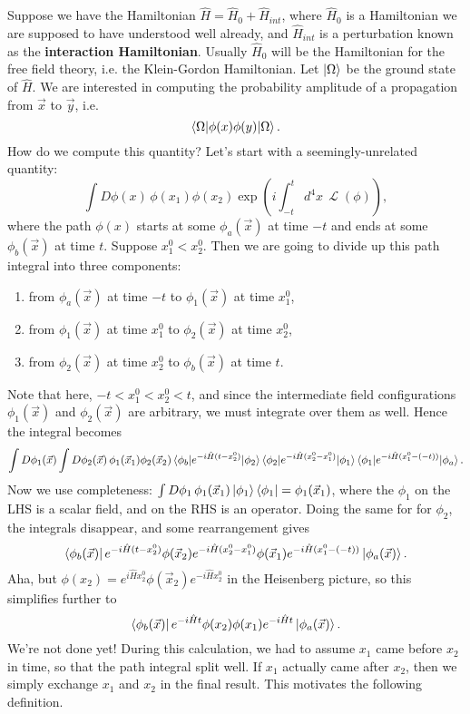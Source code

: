 \documentclass{report}
\theoremstyle{plain}
\theoremstyle{definition}
\theoremstyle{remark}
\DeclareMathOperator{\cL}{\mathcal{L}}
\begin{document}
Suppose we have the Hamiltonian $\hat{H} = \hat{H}_0 + \hat{H}_{int}$,
where $\hat{H}_0$ is a Hamiltonian we are supposed to have understood
well already, and $\hat{H}_{int}$ is a perturbation known as the {\bf
  interaction Hamiltonian}. Usually $\hat{H}_0$ will be the
Hamiltonian for the free field theory, i.e. the Klein-Gordon
Hamiltonian. Let $\ket{\Omega}$ be the ground state of $\hat{H}$. We
are interested in computing the probability amplitude of a propagation
from $\vec{x}$ to $\vec{y}$, i.e.
$$ \braket{\Omega| \phi(x) \phi(y) | \Omega}. $$
How do we compute this quantity? Let's start with a
seemingly-unrelated quantity:
$$ \int D\phi(x) \, \phi(x_1) \phi(x_2) \exp\left(i \int_{-t}^t d^4x \, \cL(\phi)\right), $$
where the path $\phi(x)$ starts at some $\phi_a(\vec{x})$ at time $-t$
and ends at some $\phi_b(\vec{x})$ at time $t$. Suppose
$x_1^0 < x_2^0$. Then we are going to divide up this path integral
into three components:
\begin{enumerate}
\item from $\phi_a(\vec{x})$ at time $-t$ to $\phi_1(\vec{x})$ at time $x_1^0$, 
\item from $\phi_1(\vec{x})$ at time $x_1^0$ to $\phi_2(\vec{x})$ at time $x_2^0$,
\item from $\phi_2(\vec{x})$ at time $x_2^0$ to $\phi_b(\vec{x})$ at time $t$.
\end{enumerate}
Note that here, $-t < x_1^0 < x_2^0 < t$, and since the intermediate
field configurations $\phi_1(\vec{x})$ and $\phi_2(\vec{x})$ are
arbitrary, we must integrate over them as well. Hence the integral
becomes
$$ \int D\phi_1(\vec{x}) \int D\phi_2(\vec{x}) \, \phi_1(\vec{x}_1) \phi_2(\vec{x}_2) \braket{\phi_b | e^{-i\hat{H}(t - x_2^0)} | \phi_2}\braket{\phi_2 | e^{-i\hat{H}(x_2^0 - x_1^0)} | \phi_1}\braket{\phi_1 | e^{-i\hat{H}(x_1^0 - (-t))} | \phi_a}. $$
Now we use completeness:
$\int D\phi_1 \, \phi_1(\vec{x}_1) \ket{\phi_1}\bra{\phi_1} =
\phi_1(\vec{x}_1)$,
where the $\phi_1$ on the LHS is a scalar field, and on the RHS is an
operator. Doing the same for for $\phi_2$, the integrals disappear,
and some rearrangement gives
$$ \bra{\phi_b(\vec{x})} e^{-i\hat{H}(t - x_2^0)} \phi(\vec{x}_2) e^{-i\hat{H}(x_2^0 - x_1^0)} \phi(\vec{x}_1) e^{-i\hat{H}(x_1^0 - (-t))} \ket{\phi_a(\vec{x})}. $$
Aha, but
$\phi(x_2) = e^{i\hat{H}x_2^0}\phi(\vec{x}_2)e^{-i\hat{H}x_2^0}$ in
the Heisenberg picture, so this simplifies further to
$$ \bra{\phi_b(\vec{x})} e^{-i\hat{H}t} \phi(x_2)\phi(x_1) e^{-i\hat{H}t} \ket{\phi_a(\vec{x})}. $$
We're not done yet! During this calculation, we had to assume $x_1$
came before $x_2$ in time, so that the path integral split well. If
$x_1$ actually came after $x_2$, then we simply exchange $x_1$ and
$x_2$ in the final result. This motivates the following definition.
\end{document}
